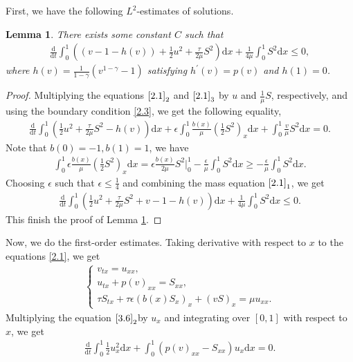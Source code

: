\documentclass[10pt,reqno]{amsart}
\numberwithin{equation}{section}
\newtheorem{lemma}[theorem]{Lemma}
\newcommand{\dif}{\mathrm{d}}
\begin{document}
First, we have the following $L^2$-estimates of solutions.
\begin{lemma}\label{Le3.2}
There exists some constant $C$ such that 
\begin{align}\label{3.5}
\frac{\dif}{\dif t} \int_0^1 \left( (v-1-h(v))+\frac{1}{2}u^2+\frac{\tau}{2\mu} S^2 \right) \dif x +\frac{1}{4\mu}\int_0^1  S^2 \dif x \le 0,
\end{align}
where $h(v)=\frac{1}{1-\gamma}(v^{1-\gamma}-1)$ satisfying $h^\prime(v)=p(v)$ and $h(1)=0$.
\end{lemma}
\begin{proof}
Multiplying the equations $\eqref{2.1}_2$ and $\eqref{2.1}_3$ by $u$ and $\frac{1}{\mu}S$, respectively,  and using the boundary condition \eqref{2.3}, we get the following equality,
\begin{align*}
\frac{\dif}{\dif t} \int_0^1 \left(\frac{1}{2}u^2+\frac{\tau}{2\mu} S^2-h(v)\right)\dif x +\epsilon \int_0^1 \frac{b(x)}{\mu} \left(\frac{1}{2}S^2\right)_x \dif x +\int_0^1 \frac{v}{\mu} S^2\dif x 
=0.
\end{align*}
Note that $b(0)=-1, b(1)=1$, we have
\begin{align*}
\int_0^1 \epsilon \frac{b(x)}{\mu} \left(\frac{1}{2}S^2\right)_x \dif x
=\epsilon \frac{b(x)}{2\mu} S^2\big|_0^1-\frac{\epsilon}{\mu} \int_0^1 S^2 \dif x \ge -\frac{\epsilon}{\mu} \int_0^1 S^2 \dif x.
\end{align*}
Choosing $\epsilon$ such that $\epsilon \le \frac{1}{4}$ and combining the mass equation $\eqref{2.1}_1$, we get
\begin{align*}
\frac{\dif}{\dif t} \int_0^1 \left( \frac{1}{2} u^2+\frac{\tau}{2\mu}S^2+v-1-h(v)\right)\dif x +\frac{1}{4\mu} \int_0^1 S^2 \dif x \le 0.
\end{align*}
This finish the proof of  Lemma \ref{Le3.2}.
\end{proof}
Now, we do the first-order estimates.  Taking derivative with respect to $x$ to the equations \eqref{2.1}, we get
\begin{align}\label{3.6}
\begin{cases}
v_{tx}=u_{xx},\\
u_{tx}+p(v)_{xx}=S_{xx},\\
\tau S_{tx}+\tau\epsilon (b(x) S_x)_x+(vS)_x=\mu u_{xx}.
\end{cases}
\end{align}
Multiplying the equation $\eqref{3.6}_2$by $u_x$ and integrating over $[0, 1]$ with respect to $x$, we get
\begin{align*}
\frac{\dif}{\dif t} \int_0^1 \frac{1}{2} u_x^2 \dif x +\int_0^1 (p(v)_{xx}-S_{xx})u_x \dif x=0.
\end{align*}
\end{document}
